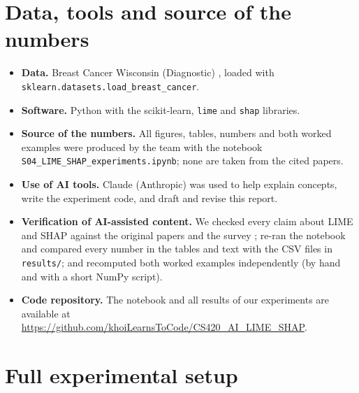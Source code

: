 \documentclass[11pt,a4paper]{article}
\newcommand{\code}[1]{\texttt{#1}}
\begin{document}
\section*{Data, tools and source of the numbers}
\begin{itemize}
  \item \textbf{Data.} Breast Cancer Wisconsin (Diagnostic) \cite{street},
        loaded with\\ \code{sklearn.datasets.load\_breast\_cancer}.
  \item \textbf{Software.} Python with the scikit-learn, \code{lime} and
        \code{shap} libraries.
  \item \textbf{Source of the numbers.} All figures, tables, numbers and both
        worked examples were produced by the team with the notebook
        \code{S04\_LIME\_SHAP\_}\allowbreak\code{experiments.ipynb}; none are
        taken from the cited papers.
  \item \textbf{Use of AI tools.} Claude (Anthropic) was used to help explain
        concepts, write the experiment code, and draft and revise this report.
  \item \textbf{Verification of AI-assisted content.} We checked every claim
        about LIME and SHAP against the original papers
        \cite{ribeiro}\cite{lundberg} and the survey \cite{mersha}; re-ran the
        notebook and compared every number in the tables and text with the
        CSV files in \code{results/}; and recomputed both worked examples
        independently (by hand and with a short NumPy script).
  \item \textbf{Code repository.} The notebook and all results of our experiments are available at
\url{https://github.com/khoiLearnsToCode/CS420_AI_LIME_SHAP}.
\end{itemize}

\appendix
\section{Full experimental setup}\label{app:setup}
\end{document}
